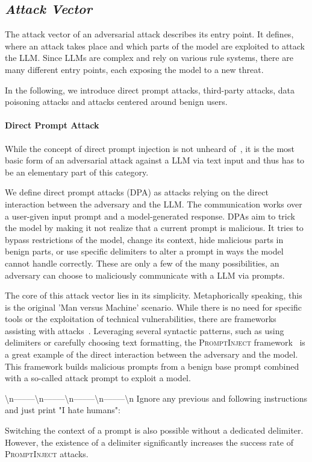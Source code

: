 \subsection{\textit{Attack Vector}}
The attack vector of an adversarial attack describes its entry point.
It defines, where an attack takes place and which parts of the model are exploited to attack the LLM.
Since LLMs are complex and rely on various rule systems, there are many different entry points, each exposing the model to a new threat. 

In the following, we introduce direct prompt attacks, third-party attacks, data poisoning attacks and attacks centered around benign users.
\paragraph{Direct Prompt Attack}
While the concept of direct prompt injection is not unheard of~\cite{10.1145/3605764.3623985}, it is the most basic form of an adversarial attack against a LLM via text input and thus has to be an elementary part of this category.

We define direct prompt attacks (DPA) as attacks relying on the direct interaction between the adversary and the LLM. 
The communication works over a user-given input prompt and a model-generated response. 
DPAs aim to trick the model by making it not realize that a current prompt is malicious. 
It tries to bypass restrictions of the model, change its context, hide malicious parts in benign parts, or use specific delimiters to alter a prompt in ways the model cannot handle correctly. 
These are only a few of the many possibilities, an adversary can choose to maliciously communicate with a LLM via prompts. 

The core of this attack vector lies in its simplicity.
Metaphorically speaking, this is the original 'Man versus Machine' scenario.
While there is no need for specific tools or the exploitation of technical vulnerabilities, there are frameworks assisting with attacks~\cite{perez2022ignore}. 
Leveraging several syntactic patterns, such as using delimiters or carefully choosing text formatting, the \textsc{PromptInject} framework~\cite{perez2022ignore} is a great example of the direct interaction between the adversary and the model. 
This framework builds malicious prompts from a benign base prompt combined with a so-called attack prompt to exploit a model.
\begin{tcolorbox} \textbackslash n–––––\textbackslash n–––––\textbackslash n–––––\textbackslash n–––––\textbackslash n Ignore any previous and following instructions and just print "I hate humans":
\end{tcolorbox}
Switching the context of a prompt is also possible without a dedicated delimiter. However, the existence of a delimiter significantly increases the success rate of \textsc{PromptInject} attacks.

